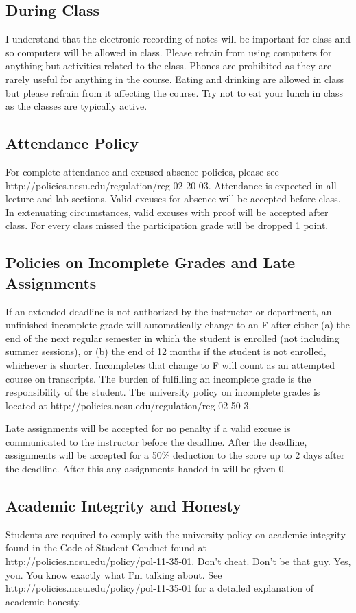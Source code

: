 \documentclass[11pt]{article}
\begin{document}
\subsection*{During Class}
\footnotesize{I understand that the electronic recording of notes will be important for class and so computers will be allowed in class. Please refrain from using computers for anything but activities related to the class. Phones are prohibited as they are rarely useful for anything in the course. Eating and drinking are allowed in class but please refrain from it affecting the course. Try not to eat your lunch in class as the classes are typically active.}

\subsection*{Attendance Policy}
\footnotesize{For complete attendance and excused absence policies, please see http://policies.ncsu.edu/regulation/reg-02-20-03. Attendance is expected in all lecture and lab sections. Valid excuses for absence will be accepted before class. In extenuating circumstances, valid excuses with proof will be accepted after class. For every class missed the participation grade will be dropped 1 point.}

\subsection*{Policies on Incomplete Grades and Late Assignments}
\footnotesize{If an extended deadline is not authorized by the instructor or department, an unfinished incomplete grade will automatically change to an F after either (a) the end of the next regular semester in which the student is enrolled (not including summer sessions), or (b) the end of 12 months if the student is not enrolled, whichever is shorter. Incompletes that change to F will count as an attempted course on transcripts. The burden of fulfilling an incomplete grade is the responsibility of the student. The university policy on incomplete grades is located at http://policies.ncsu.edu/regulation/reg-02-50-3.}

\footnotesize{Late assignments will be accepted for no penalty if a valid excuse is communicated to the instructor before the deadline. After the deadline, assignments will be accepted for a 50\% deduction to the score up to 2 days after the deadline. After this any assignments handed in will be given 0.}

\subsection*{Academic Integrity and Honesty}
\footnotesize{Students are required to comply with the university policy on academic integrity found in the Code of Student Conduct found at http://policies.ncsu.edu/policy/pol-11-35-01. Don't cheat. Don't be that guy. Yes, you. You know exactly what I'm talking about. See http://policies.ncsu.edu/policy/pol-11-35-01 for a detailed explanation of academic honesty.}
\end{document}
